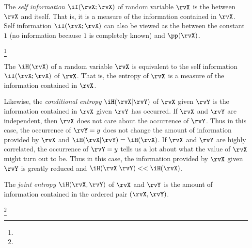 The {\em self information} $\iI(\rvX;\rvX)$ of random variable $\rvX$ is the 
 between $\rvX$ and itself.
That is, it is a measure of the information contained in $\rvX$.
Self information $\iI(\rvX;\rvX)$ can also be viewed as the  between
the constant $1$ (no information because $1$ is completely known)
and $\pp(\rvX)$.
\begin{definition}
\footnote{
  }
\label{def:I(X;X)}
\end{definition}

The  $\iH(\rvX)$ of a random variable $\rvX$ is equivalent to
the self information $\iI(\rvX;\rvX)$ of $\rvX$.
That is, the entropy of $\rvX$ is a measure of the information contained
in $\rvX$.

Likewise, the {\em conditional entropy} $\iH(\rvX|\rvY)$ 
of $\rvX$ given $\rvY$ is the information
contained in $\rvX$ given $\rvY$ has occurred. 
If $\rvX$ and $\rvY$ are independent, then $\rvX$ does not care about the occurrence of
$\rvY$. Thus in this case, 
the occurrence of $\rvY=y$ does not change the amount of information
provided by $\rvX$ and $\iH(\rvX|\rvY)=\iH(\rvX)$.
If $\rvX$ and $\rvY$ are highly correlated, 
the occurrence of $\rvY=y$ tells us a lot about what the value of $\rvX$ might
turn out to be.
Thus in this case, the information provided by $\rvX$ given $\rvY$ is greatly reduced
and $\iH(\rvX|\rvY)<<\iH(\rvX)$.

The {\em joint entropy} $\iH(\rvX,\rvY)$ of $\rvX$ and $\rvY$ is the amount of information 
contained in the ordered pair $(\rvX,\rvY)$.

\begin{definition}[Entropy]
\footnote{
  }
\label{def:H(X)}
\label{def:H(XY)}
\end{definition}


